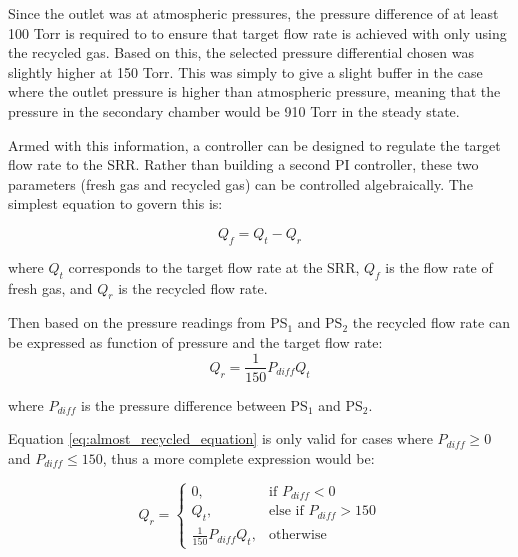 Since the outlet was at atmospheric pressures, the pressure difference of at least 100 Torr is required to to ensure that target flow rate is achieved with only using the recycled gas. Based on this, the selected pressure differential chosen was slightly higher at 150 Torr. This was simply to give a slight buffer in the case where the outlet pressure is higher than atmospheric pressure, meaning that the pressure in the secondary chamber would be 910 Torr in the steady state.

Armed with this information, a controller can be designed to regulate the target flow rate to the SRR. Rather than building a second PI controller, these two parameters (fresh gas and recycled gas) can be controlled algebraically. The simplest equation to govern this is:

\begin{equation}
    Q_f = Q_t - Q_r
    \label{eq:fresh_equation}
\end{equation}

where $Q_t$ corresponds to the target flow rate at the SRR, $Q_f$ is the flow rate of fresh gas, and $Q_r$ is the recycled flow rate.

Then based on the pressure readings from PS$_1$ and PS$_2$ the recycled flow rate can be expressed as function of pressure and the target flow rate:
\begin{equation}
    Q_r = \frac{1}{150} P_{diff} Q_t 
    \label{eq:almost_recycled_equation}
\end{equation}

where $P_{diff}$ is the pressure difference between PS$_1$ and PS$_2$. 


Equation \ref{eq:almost_recycled_equation} is only valid for cases where $P_{diff} \geq 0$ and $P_{diff} \leq 150$, thus a more complete expression would be:

\begin{equation}
    Q_r = 
    \begin{cases}
        0,                          & \text{if } P_{diff} < 0\\
        Q_t,                        & \text{else if } P_{diff} > 150\\
        \frac{1}{150} P_{diff} Q_t, & \text{otherwise}
    \end{cases}
    \label{eq:recycled_equation}
\end{equation}

